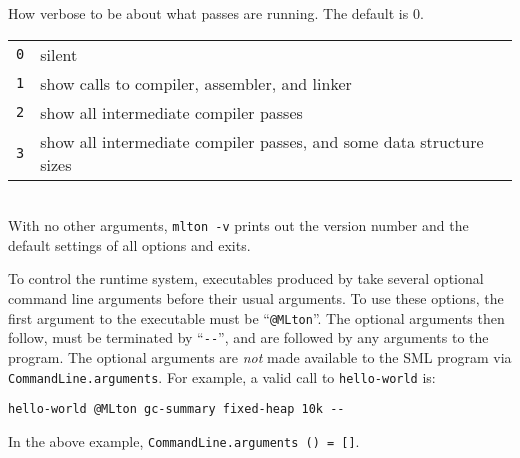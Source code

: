 \begin{description}
How verbose to be about what passes are running.  The default is 0.\\
\begin{tabular}{ll}
{\tt 0} & silent\\
{\tt 1} & show calls to compiler, assembler, and linker\\
{\tt 2} & show all intermediate compiler passes\\
{\tt 3} & show all intermediate compiler passes, and some data structure sizes\\
\end{tabular}\\
With no other arguments, {\tt mlton -v} prints out the version number and the
default settings of all options and exits.

\end{description}

%
%
%
%
%
%


To control the runtime system, executables produced by {\mlton} take
several optional command line arguments before their usual arguments.
To use these options, the first argument to the executable must be
``\verb+@MLton+''.  The optional arguments then follow, must be
terminated by ``\verb+--+'', and are followed by any arguments to the program.
The optional arguments are {\em not} made available to the SML
program via {\tt CommandLine.arguments}.  For example, a valid call
to {\tt hello-world} is: 
\begin{verbatim}
hello-world @MLton gc-summary fixed-heap 10k --
\end{verbatim}
In the above example, {\tt CommandLine.arguments () = []}.

